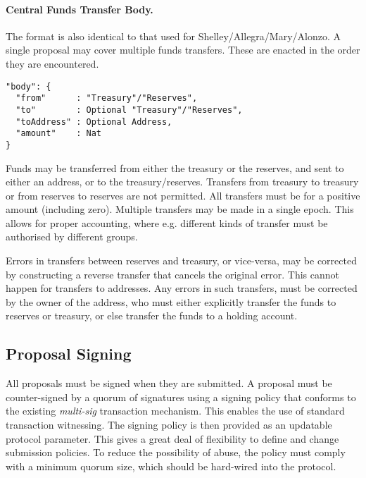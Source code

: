 \paragraph{Central Funds Transfer Body.}  The format is also identical to that used for Shelley/Allegra/Mary/Alonzo.
A single proposal may cover multiple funds transfers.  These are enacted in the order they are encountered.

\begin{verbatim}
"body": {
  "from"      : "Treasury"/"Reserves",
  "to"        : Optional "Treasury"/"Reserves",
  "toAddress" : Optional Address,
  "amount"    : Nat
}
\end{verbatim}

Funds may be transferred from either the treasury or the reserves, and sent to either an address, or to the treasury/reserves.
Transfers from treasury to treasury or from reserves to reserves are not permitted.  All transfers must be for a positive amount (including zero).
Multiple transfers may be made in a single epoch.  This allows for proper accounting, where e.g. different kinds of transfer must
be authorised by different groups.

Errors in transfers between reserves and treasury, or vice-versa, may be corrected by constructing a reverse transfer that cancels the original error.
This cannot happen for transfers to addresses.  Any errors in such transfers, must be corrected by the owner of the address, who must either explicitly transfer
the funds to reserves or treasury, or else transfer the funds to a holding account. 

\subsection{Proposal Signing}

All proposals must be signed when they are submitted.  A proposal must be counter-signed by a quorum of signatures using a signing
policy that conforms to the existing \emph{multi-sig} transaction mechanism.  This enables the use of standard transaction witnessing.
The signing policy is then provided as an updatable protocol parameter.  This gives a great deal of flexibility to define and change submission policies.
To reduce the possibility of abuse, the policy must comply with a minimum quorum size, which should be hard-wired into the protocol.


